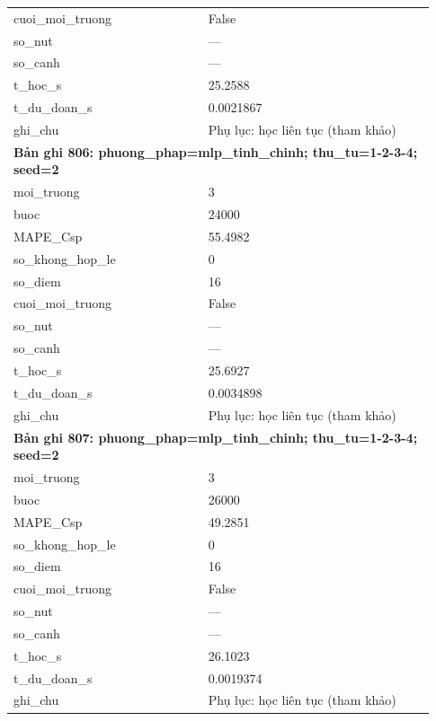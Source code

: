 \begin{longtable}{p{0.43\linewidth}p{0.50\linewidth}}
cuoi\_\allowbreak moi\_\allowbreak truong & False \\
so\_\allowbreak nut & — \\
so\_\allowbreak canh & — \\
t\_\allowbreak hoc\_\allowbreak s & 25.2588 \\
t\_\allowbreak du\_\allowbreak doan\_\allowbreak s & 0.0021867 \\
ghi\_\allowbreak chu & Phụ lục: học liên tục (tham khảo) \\
\midrule
\multicolumn{2}{p{0.95\linewidth}}{\textbf{Bản ghi 806: phuong\_phap=mlp\_tinh\_chinh; thu\_tu=1-2-3-4; seed=2}} \\
moi\_\allowbreak truong & 3 \\
buoc & 24000 \\
MAPE\_\allowbreak Csp & 55.4982 \\
so\_\allowbreak khong\_\allowbreak hop\_\allowbreak le & 0 \\
so\_\allowbreak diem & 16 \\
cuoi\_\allowbreak moi\_\allowbreak truong & False \\
so\_\allowbreak nut & — \\
so\_\allowbreak canh & — \\
t\_\allowbreak hoc\_\allowbreak s & 25.6927 \\
t\_\allowbreak du\_\allowbreak doan\_\allowbreak s & 0.0034898 \\
ghi\_\allowbreak chu & Phụ lục: học liên tục (tham khảo) \\
\midrule
\multicolumn{2}{p{0.95\linewidth}}{\textbf{Bản ghi 807: phuong\_phap=mlp\_tinh\_chinh; thu\_tu=1-2-3-4; seed=2}} \\
moi\_\allowbreak truong & 3 \\
buoc & 26000 \\
MAPE\_\allowbreak Csp & 49.2851 \\
so\_\allowbreak khong\_\allowbreak hop\_\allowbreak le & 0 \\
so\_\allowbreak diem & 16 \\
cuoi\_\allowbreak moi\_\allowbreak truong & False \\
so\_\allowbreak nut & — \\
so\_\allowbreak canh & — \\
t\_\allowbreak hoc\_\allowbreak s & 26.1023 \\
t\_\allowbreak du\_\allowbreak doan\_\allowbreak s & 0.0019374 \\
ghi\_\allowbreak chu & Phụ lục: học liên tục (tham khảo) \\

\end{longtable}
